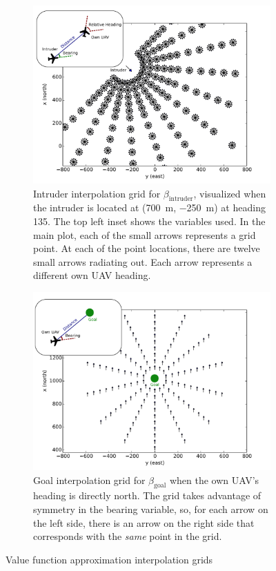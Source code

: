 \begin{figure}
    \centering
    \begin{subfigure}[t]{0.48\textwidth}
        \includegraphics[width=\textwidth]{media/intruder_grid_plus.pdf}
        \caption[Intruder interpolation grid]{Intruder interpolation grid for $\beta_\text{intruder}$, visualized when the intruder is located at (\SI{700}{m}, \SI{-250}{m}) at heading \num{135}. The top left inset shows the variables used. In the main plot, each of the small arrows represents a grid point. At each of the point locations, there are twelve small arrows radiating out. Each arrow represents a different own UAV heading.}
        \label{fig:intrudergrid}
    \end{subfigure}
    \hfill
    \begin{subfigure}[t]{0.48\textwidth}
        \includegraphics[width=\textwidth]{media/goal_grid_plus.pdf}
        \caption[Goal interpolation grid]{Goal interpolation grid for $\beta_\text{goal}$ when the own UAV's heading is directly north. The grid takes advantage of symmetry in the bearing variable, so, for each arrow on the left side, there is an arrow on the right side that corresponds with the \emph{same} point in the grid.}
        \label{fig:goalgrid}
    \end{subfigure}
    \caption{Value function approximation interpolation grids}
\end{figure}

